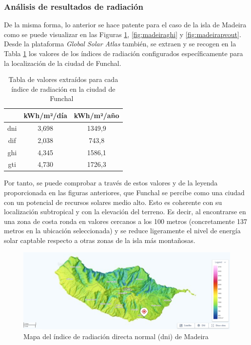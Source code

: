 \subsubsection{Análisis de resultados de radiación}

De la misma forma, lo anterior se hace patente para el caso de la isla de Madeira como se puede visualizar en las Figuras \ref{fig:madeiradni}, \ref{fig:madeiraghi} y \ref{fig:madeirapvout}. Desde la plataforma \textit{Global Solar Atlas} también, se extraen y se recogen en la Tabla \ref{tab:global} los valores de los índices de radiación configurados específicamente para la localización de la ciudad de Funchal. 

\vspace{5mm}

\begin{table}[h!]
    \centering
    \begin{tabular}{|c|c|c|}
    \hline
    \rowcolor[HTML]{AAAAAA} 
    \multicolumn{1}{|c|}{\cellcolor[HTML]{AAAAAA}Parámetro} & \multicolumn{1}{c|}{\cellcolor[HTML]{AAAAAA}kWh/m²/día} & kWh/m²/año \\ \hline
    \gls{dni} & 3,698 & 1349,9 \\ \hline
    \gls{dif} & 2,038 & 743,8 \\ \hline
    \gls{ghi} & 4,345 & 1586,1 \\ \hline
    \gls{gti} & 4,730 & 1726,3 \\ \hline
    \end{tabular}
    \caption{Tabla de valores extraídos para cada índice de radiación en la ciudad de Funchal~\cite{globalsolar}}
    \label{tab:global}
\end{table}

\vspace{3mm}

Por tanto, se puede comprobar a través de estos valores y de la leyenda proporcionada en las figuras anteriores, que Funchal se percibe como una ciudad con un potencial de recursos solares medio alto. Esto es coherente con su localización subtropical y con la elevación del terreno. Es decir, al encontrarse en una zona de costa ronda en valores cercanos a los 100 metros (concretamente 137 metros en la ubicación seleccionada) y se reduce ligeramente el nivel de energía solar captable respecto a otras zonas de la isla más montañosas.

\clearpage

\begin{figure}[H]
    \centering
    \includegraphics[width=1\textwidth]{img/diseno/madeiradni.png}
    \caption{Mapa del índice de radiación directa normal (\acrshort{dni}) de Madeira \cite{globalsolar}}
    \label{fig:madeiradni}
\end{figure}

